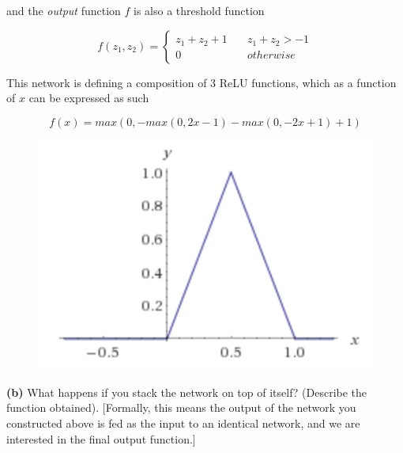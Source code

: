 \documentclass[11pt]{article}
\renewcommand\part[1]{\vspace{.10in}\textbf{(#1)}}
\begin{document}
{{and the \textit{output} function $f$ is also a threshold function

$$    
f(z_1, z_2) = \left\{
        \begin{array}{ll}
            z_1 + z_2 + 1 & \quad z_1 + z_2 > -1\\
            0 & \quad otherwise
        \end{array}
    \right.
$$

This network is defining a composition of 3 ReLU functions, which as a function of $x$ can be expressed as such 

$$f(x) = max(0 , -max(0, 2x - 1) - max(0, -2x + 1) + 1)$$

\begin{figure}[H]
  \centerline{\includegraphics[width=0.5\linewidth]{13a.png}}
\end{figure}

} }

\part{b} What happens if you stack the network on top of itself? (Describe the function obtained). [Formally, this means the output of the network you constructed above is fed as the input to an identical network, and we are interested in the final output function.]
\end{document}

